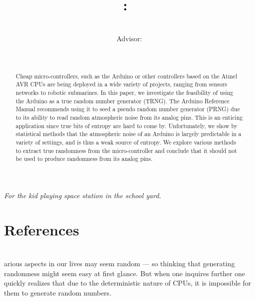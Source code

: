 \documentclass[a4paper]{article}           %
\title{
    \Class:\ \Title
    \ifthenelse{\equal{\SubTitle}{}}{}{\\{\SubTitle}}
    }
\date{\small{\DueLang\ \DueDate}}
\author{\AuthorName\\Advisor: \ClassInstructor}
\newenvironment{dedication}
{
   \cleardoublepage
   \thispagestyle{empty}
   \vspace*{\stretch{1}}
   \hfill\begin{minipage}[t]{0.75\textwidth}
   \raggedright
}%
{
   \end{minipage}
   \vspace*{\stretch{3}}
   \clearpage
}
\newcommand{\tmpsection}[1]{}
\let\tmpsection=\section
\renewcommand{\section}[2]{

    \ifthenelse{
      \equal{#2}{*} %
    }
    {
      \tmpsection{References}
      \tmpsection{\sc{#2} }
    }
    {\tmpsection{\sc{#1} } }
      

}
\begin{document}


\begin{dedication}
\textit{For the kid playing space station in the school yard. }
\end{dedication}
\newpage



\begin{abstract}

  Cheap micro-controllers, such as the Arduino or other controllers
  based on the Atmel AVR CPUs are being deployed in a wide variety of
  projects, ranging from sensors networks to robotic submarines. In
  this paper, we investigate the feasibility of using the Arduino as a
  true random number generator (TRNG). The Arduino Reference Manual
  recommends using it to seed a pseudo random number generator (PRNG)
  due to its ability to read random atmospheric noise from its
  analog pins. This is an enticing application since true bits
  of entropy are hard to come by. Unfortunately, we show by
  statistical methods that the atmospheric noise of an Arduino is
  largely predictable in a variety of settings, and is thus a weak
  source of entropy. We explore various methods to extract true
  randomness from the micro-controller and conclude that it should not
  be used to produce randomness from its analog pins.

\end{abstract}

\section{Introduction}

Various aspects in our lives may seem random --- so thinking that generating randomness might seem easy at first glance. But when one inquires further one quickly realizes that due to the deterministic nature of CPUs, it is impossible for them to generate random numbers. 
\end{document}
